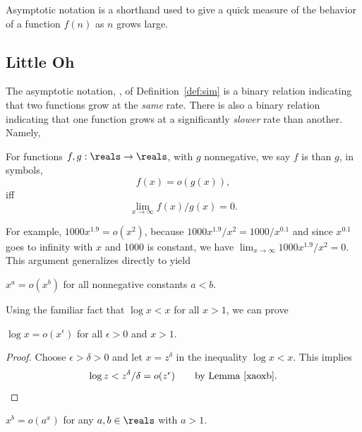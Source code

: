 \label{asymptotic_sec}

Asymptotic notation is a shorthand used to give a quick measure of the
behavior of a function $f(n)$ as $n$ grows large.

\subsection{Little Oh}

The asymptotic notation, \idx{$\sim$}, of Definition~\ref{def:sim} is a
binary relation indicating that two functions grow at the \emph{same}
rate.  There is also a binary relation indicating that one function grows
at a significantly \emph{slower} rate than another.  Namely,
\begin{definition}
  For functions $f,g: \reals \to \reals$, with $g$ nonnegative, we say $f$
  is  than
  $g$, in symbols,
\[
f(x) = o(g(x)),
\]
iff
\[
\lim_{x \rightarrow \infty} f(x)/g(x) = 0.
\]
\end{definition}

For example, $1000x^{1.9} = o(x^2)$, because $1000x^{1.9}/x^2 =
1000/x^{0.1}$ and since $x^{0.1}$ goes to infinity with $x$ and 1000 is
constant, we have $\lim_{x \rightarrow \infty} 1000x^{1.9}/x^2 = 0$.
This argument generalizes directly to yield
\begin{lemma}\label{xaoxb}
$x^a = o(x^b)$ for all nonnegative constants $a<b$.
\end{lemma}

Using the familiar fact that  $\log x < x$ for all $x >1$, we can prove
\begin{lemma}\label{logxxe}
$\log x = o(x^{\epsilon})$ for all $\epsilon >0$ and $x > 1$.
\end{lemma}

\begin{proof}
Choose $\epsilon > \delta > 0$ and let $x = z^\delta$ in the inequality
$\log x < x$.  This implies
\begin{equation}\label{zdd}
\log z  <  z^{\delta}/\delta
 =  o(z^{\epsilon})\qquad \text{by Lemma~\ref{xaoxb}}.
\end{equation}
\end{proof}

\begin{corollary}\label{xbax}
$x^b = o(a^x)$ for any $a,b \in \reals$ with $a>1$.
\end{corollary}

